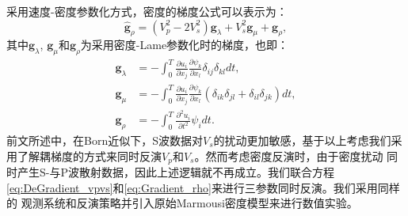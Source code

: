 采用速度-密度参数化方式，密度的梯度公式可以表示为\cite[]{mora:1987,kohn:2012}：
\begin{equation} 
    \hat{\mathbf{g}}_{\rho}=(V^2_p-2V^2_s)\mathbf{g}_{\lambda}+V^2_s\mathbf{g}_{\mu}+\mathbf{g}_{\rho},
    \label{eq:Gradient_rho} 
\end{equation}
其中$\mathbf{g}_{\lambda}$, $\mathbf{g}_{\mu}$和$\mathbf{g}_{\rho}$为采用密度-Lame参数化时的梯度，也即：
    \begin{equation} 
        \begin{split}
                \mathbf{g}_{\lambda}&=-\int_{0}^{T}\frac{\partial u_i}{\partial
        x_j}\frac{\partial \psi_k}{\partial x_l}
        \delta_{ij}\delta_{kl}dt,\\
                \mathbf{g}_{\mu}&=-\int_{0}^{T}\frac{\partial u_i}{\partial
        x_j}\frac{\partial \psi_k}{\partial x_l} 
        (\delta_{ik}\delta_{jl}+\delta_{il}\delta_{jk})dt,\\
                \mathbf{g}_{\rho}&=-\int_{0}^{T}\frac{\partial^2 u_i}{\partial
        t^2}\psi_idt.
        \end{split}
        \label{eq:DeGradient_vpvsrho}
    \end{equation}
前文所述中，在Born近似下，S波数据对$V_s$的扰动更加敏感，基于以上考虑我们采用了解耦梯度的方式来同时反演$V_p$和$V_s$。然而考虑密度反演时，由于密度扰动
同时产生S-与P波散射数据，因此上述逻辑就不再成立。我们联合方程\ref{eq:DeGradient_vpvs}和\ref{eq:Gradient_rho}来进行三参数同时反演。我们采用同样的
观测系统和反演策略并引入原始Marmousi密度模型来进行数值实验。

